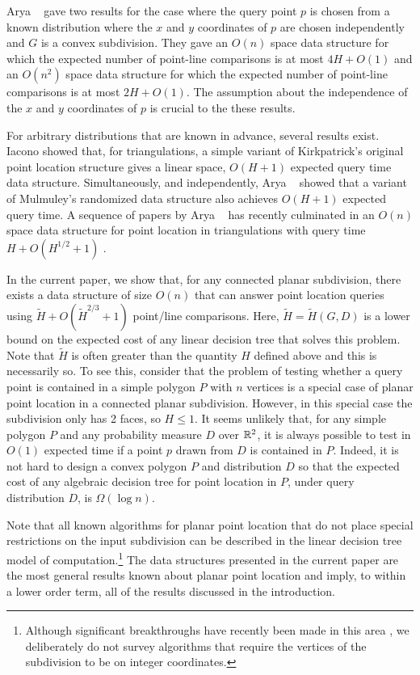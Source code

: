 \documentclass[lotsofwhite]{patmorin}
\begin{document}
Arya \etal\ \cite{acmr00} gave two results for the case where the
query point $p$ is chosen from a known distribution where the $x$ and
$y$ coordinates of $p$ are chosen independently and $G$ is a convex
subdivision.  They gave an $O(n)$ space data structure for which the
expected number of point-line comparisons is at most $4H+O(1)$ and an
$O(n^2)$ space data structure for which the expected number of
point-line comparisons is at most $2H+O(1)$.  The assumption about the
independence of the $x$ and $y$ coordinates of $p$ is crucial to the
these results.

For arbitrary distributions that are known in advance, several results
exist.  Iacono \cite{i01,i04} showed that, for triangulations, a
simple variant of Kirkpatrick's original point location structure
gives a linear space, $O(H+1)$ expected query time data structure.
Simultaneously, and independently, Arya \etal\ \cite{amm01b} showed
that a variant of Mulmuley's randomized data structure also achieves
$O(H+1)$ expected query time.  A sequence of papers by Arya \etal\
\cite{amm00,amm01a,ammw07} has recently culminated in an $O(n)$ space
data structure for point location in triangulations with query time
$H+O(H^{1/2} + 1)$ \cite{ammw07}.

In the current paper, we show that, for any connected planar
subdivision, there exists a data structure of size $O(n)$ that can
answer point location queries using $\tilde H + O(\tilde H^{2/3}+1)$
point/line comparisons.  Here, $\tilde H=\tilde H(G,D)$ is a lower
bound on the expected cost of any linear decision tree that solves
this problem.  Note that $\tilde H$ is often greater than the quantity
$H$ defined above and this is necessarily so.  To see this, consider
that the problem of testing whether a query point is contained in a
simple polygon $P$ with $n$ vertices is a special case of planar point
location in a connected planar subdivision.  However, in this special
case the subdivision only has 2 faces, so $H\le 1$.  It seems unlikely
that, for any simple polygon $P$ and any probability measure $D$ over $\mathbb{R}^2$,
it is always possible to test in $O(1)$ expected time if a point
$p$ drawn from $D$ is contained in $P$.  Indeed, it is not hard to
design a convex polygon $P$ and distribution $D$ so that the expected
cost of any algebraic decision tree for point location in $P$, under
query distribution $D$, is $\Omega(\log n)$.

Note that all known algorithms for planar point location that do not
place special restrictions on the input subdivision can be described
in the linear decision tree model of computation.\footnote{Although
significant breakthroughs have recently been made in this area
\cite{c06,p06}, we deliberately do not survey algorithms that require
the vertices of the subdivision to be on integer coordinates.}  The
data structures presented in the current paper are the most general
results known about planar point location and imply, to within a
lower order term, all of the results discussed in the introduction.
\end{document}
